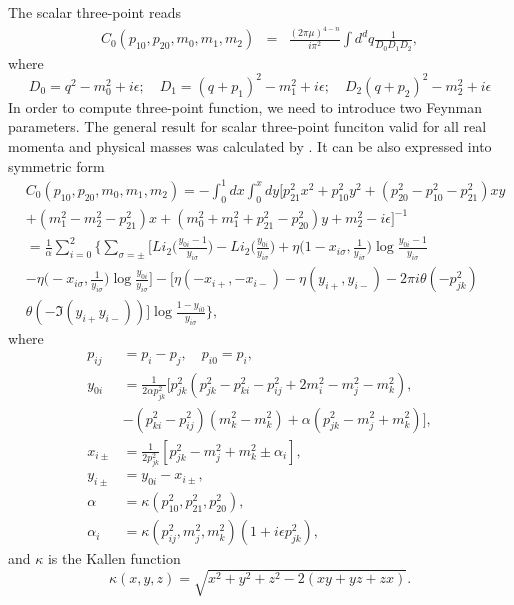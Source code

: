 The scalar three-point reads
\begin{eqnarray}
C_0(p_{10},p_{20},m_0,m_1,m_2)&=&\frac{{(2\pi\mu)}^{4-n}}{i\pi^2}\int d^d q\frac{1}{D_0 D_1 D_2},
\end{eqnarray}
where
\begin{equation}
D_0=q^2-m_0^2+i\epsilon;\quad D_1=(q+p_1)^2-m_1^2+i\epsilon;\quad D_2(q+p_2)^2-m_2^2+i\epsilon
\end{equation}
In order to compute three-point function, we need to introduce two Feynman parameters. The general result for scalar three-point funciton valid for all real momenta and physical masses was calculated by \cite{tHscarlar}. It can be also expressed into symmetric form
\begin{align}
&C_0(p_{10},p_{20},m_0,m_1,m_2)=-\int_0^1 dx\int_0^xdy[p^2_{21}x^2+p^2_{10}y^2+(p^2_{20}-p^2_{10}-p^2_{21})xy\nonumber\\
&+(m_1^2-m^2_2-p^2_{21})x+(m_0^2+m_1^2+p^2_{21}-p^2_{20})y+m_2^2-i\epsilon]^{-1}\nonumber\\
&=\frac{1}{\alpha}\sum_{i=0}^{2}\biggl\{ \sum_{\sigma=\pm}\biggl[ Li_2\biggl(\frac{y_{0i}-1}{y_{i\sigma}}\biggr)-Li_2\biggl(\frac{y_{0i}}{y_{i\sigma}}\biggr)+\eta\biggl(1-x_{i\sigma},\frac{1}{y_{i\sigma}}\biggr)\log\frac{y_{0i}-1}{y_{i\sigma}}\nonumber\\
&-\eta\biggl(-x_{i\sigma},\frac{1}{y_{i\sigma}}\biggr)\log\frac{y_{0i}}{y_{i\sigma}} \biggr] -[\eta(-x_{i+},-x_{i-})-\eta(y_{i+},y_{i-})-2\pi i\theta(-p^2_{jk})\nonumber\\
&\theta(-\Im(y_{i+}y_{i-}))]\log\frac{1-y_{i0}}{y_{i\sigma}}  \biggr\},
\end{align}
where 
\begin{align}
p_{ij}&=p_i-p_j, \quad p_{i0}=p_i,\nonumber\\
y_{0i}&=\frac{1}{2\alpha p^2_{jk}}[p^2_{jk}(p^2_{jk}-p^2_{ki}-p^2_{ij}+2m_i^2-m_j^2-m_k^2),\nonumber\\
&-(p^2_{ki}-p^2_{ij})(m^2_k-m^2_k)+\alpha(p^2_{jk}-m^2_j+m^2_k)],\nonumber\\
x_{i\pm}&=\frac{1}{2p_{jk}^2}[p^2_{jk}-m^2_j+m^2_k\pm\alpha_i],\nonumber\\
y_{i\pm}&=y_{0i}-x_{i\pm},\nonumber\\
\alpha&=\kappa(p^2_{10},p^2_{21},p^2_{20}),\nonumber\\
\alpha_i&=\kappa(p^2_{ij},m^2_j,m^2_k)(1+i\epsilon p^2_{jk}),
\end{align}
and $\kappa$ is the Kallen function
\begin{equation}
\kappa(x,y,z)=\sqrt{x^2+y^2+z^2-2(xy+yz+zx)}.
\end{equation}

